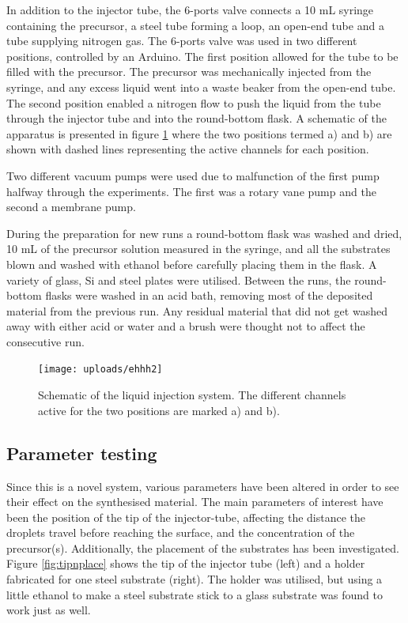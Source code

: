 \documentclass[Main/main.tex]{subfiles}
\begin{document}
In addition to the injector tube, the 6-ports valve connects a 10 mL syringe containing the precursor, a steel tube forming a loop, an open-end tube and a tube supplying nitrogen gas. The 6-ports valve was used in two different positions, controlled by an Arduino. The first position allowed for the tube to be filled with the precursor. The precursor was mechanically injected from the syringe, and any excess liquid went into a waste beaker from the open-end tube. The second position enabled a nitrogen flow to push the liquid from the tube through the injector tube and into the round-bottom flask. A schematic of the apparatus is presented in figure \ref{fig:ehhh1} where the two positions termed a) and b) are shown with dashed lines representing the active channels for each position. 

Two different vacuum pumps were used due to malfunction of the first pump halfway through the experiments. The first was a rotary vane pump and the second a membrane pump.

During the preparation for new runs a round-bottom flask was washed and dried, 10 mL of the precursor solution measured in the syringe, and all the substrates blown and washed with ethanol before carefully placing them in the flask. A variety of glass, Si and steel plates were utilised. Between the runs, the round-bottom flasks were washed in an acid bath, removing most of the deposited material from the previous run. Any residual material that did not get washed away with either acid or water and a brush were thought not to affect the consecutive run.

\begin{figure}[p]
\centering
\texttt{[image: uploads/ehhh2]} 
\caption{Schematic of the liquid injection system. The different channels active for the two positions are marked a) and b). }
\label{fig:ehhh1}
\end{figure}



\FloatBarrier
\subsection{Parameter testing}
Since this is a novel system, various parameters have been altered in order to see their effect on the synthesised material. The main parameters of interest have been the position of the tip of the injector-tube, affecting the distance the droplets travel before reaching the surface, and the concentration of the precursor(s). Additionally, the placement of the substrates has been investigated. Figure \ref{fig:tipnplace} shows the tip of the injector tube (left) and a holder fabricated for one steel substrate (right). The holder was utilised, but using a little ethanol to make a steel substrate stick to a glass substrate was found to work just as well.
\end{document}
